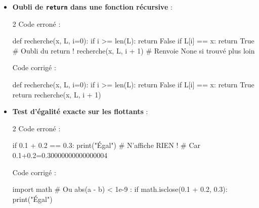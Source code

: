 \documentclass[11pt,a4paper]{article}
\begin{document}
\begin{tcolorbox}[left=0cm,title=\bf{\faExclamationTriangle \; 9. Pièges logiques classiques (Aucune exception mais résultat faux !)},colbacktitle=cfond]
\begin{itemize}
	\item[\textbullet] \textbf{Oubli de \texttt{return} dans une fonction récursive} :
	\begin{multicols}{2}
		\textcolor{BrickRed}{\faTimesCircle \; Code erroné :}
		\begin{python}
def recherche(x, L, i=0):
    if i >= len(L):
        return False
    if L[i] == x:
        return True
    # Oubli du return !
    recherche(x, L, i + 1)
# Renvoie None si trouvé plus loin
		\end{python}
		\textcolor{OliveGreen}{\faCheckCircle \; Code corrigé :}
		\begin{python}
def recherche(x, L, i=0):
    if i >= len(L):
        return False
    if L[i] == x:
        return True
    return recherche(x, L, i + 1)
		\end{python}
	\end{multicols}

	\item[\textbullet] \textbf{Test d'égalité exacte sur les flottants} :
	\begin{multicols}{2}
		\textcolor{BrickRed}{\faTimesCircle \; Code erroné :}
		\begin{python}
if 0.1 + 0.2 == 0.3:
    print("Égal") # N'affiche RIEN !
# Car 0.1+0.2=0.30000000000000004
		\end{python}
		\textcolor{OliveGreen}{\faCheckCircle \; Code corrigé :}
		\begin{python}
import math
# Ou abs(a - b) < 1e-9 :
if math.isclose(0.1 + 0.2, 0.3):
    print("Égal")
		\end{python}
	\end{multicols}
\end{itemize}
\end{tcolorbox}
\end{document}
